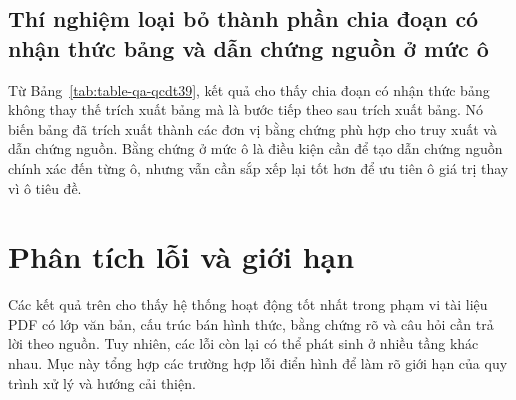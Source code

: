 \documentclass[../DoAn.tex]{subfiles}
\begin{document}
\subsection{Thí nghiệm loại bỏ thành phần chia đoạn có nhận thức bảng và dẫn chứng nguồn ở mức ô}
\label{subsec:ablation-table-aware-chunking-cell-citation}



Từ Bảng~\ref{tab:table-qa-qcdt39}, kết quả cho thấy chia đoạn có nhận thức bảng không thay thế trích xuất bảng mà là bước tiếp theo sau trích xuất bảng. Nó biến bảng đã trích xuất thành các đơn vị bằng chứng phù hợp cho truy xuất và dẫn chứng nguồn. Bằng chứng ở mức ô là điều kiện cần để tạo dẫn chứng nguồn chính xác đến từng ô, nhưng vẫn cần sắp xếp lại tốt hơn để ưu tiên ô giá trị thay vì ô tiêu đề.

\section{Phân tích lỗi và giới hạn}

Các kết quả trên cho thấy hệ thống hoạt động tốt nhất trong phạm vi tài liệu PDF có lớp văn bản, cấu trúc bán hình thức, bằng chứng rõ và câu hỏi cần trả lời theo nguồn. Tuy nhiên, các lỗi còn lại có thể phát sinh ở nhiều tầng khác nhau. Mục này tổng hợp các trường hợp lỗi điển hình để làm rõ giới hạn của quy trình xử lý và hướng cải thiện.
\end{document}
